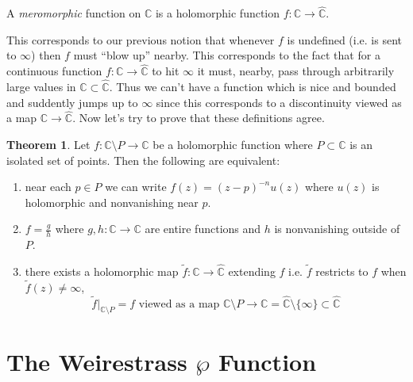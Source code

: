 \documentclass{article}
\newcommand{\C}{\mathbb{C}}
\theoremstyle{definition}
\newtheorem{theorem}{Theorem}[section]
\newenvironment{definition}[1][Definition:]{\begin{trivlist}
\item[\hskip \labelsep {\bfseries #1}]}{\end{trivlist}}
\begin{document}
\begin{definition}
A \textit{meromorphic} function on $\C$ is a holomorphic function $f : \C \to \hat{\C}$.
\end{definition}
\noindent
This corresponds to our previous notion that whenever $f$ is undefined (i.e. is sent to $\infty$) then $f$
must “blow up” nearby. This corresponds to the fact that for a continuous function $f : \C \to \hat{\C}$ to hit $\infty$ it must, nearby, pass through arbitrarily large values in $\C \subset \hat{\C}$. Thus we can’t have a function which is nice and bounded and suddently jumps up to $\infty$ since this corresponds to a discontinuity
viewed as a map $\C \to \hat{\C}$. Now let’s try to prove that these definitions agree.

\begin{theorem}
Let $f : \C \setminus P \to \C$ be a holomorphic function where $P \subset \C$ is an isolated set of points. Then the following are equivalent:
\begin{enumerate}
\item near each $p \in P$ we can write $f(z) = (z - p)^{-n} u(z)$ where $u(z)$ is holomorphic and nonvanishing near $p$.
\item $f = \frac{g}{h}$ where $g,h : \C \to \C$ are entire functions and $h$ is nonvanishing outside of $P$.
\item there exists a holomorphic map $\tilde{f} : \C \to \hat{\C}$ extending $f$ i.e. $\tilde{f}$ restricts to $f$ when $\tilde{f}(z) \neq \infty$, 
\[ \tilde{f} |_{\C \setminus P} = f \text{ viewed as a map } \C \setminus P \to \C = \hat{\C} \setminus \{ \infty \} \subset \hat{\C} \]
\end{enumerate}
\end{theorem}

\section{The Weirestrass $\wp$ Function}
\end{document}
